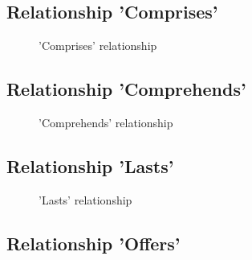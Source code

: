 \subsection*{Relationship 'Comprises'}

\begin{minipage}[h]{0.5\textwidth}
    \begin{figure}[H]
        
        \caption{'Comprises' relationship}
        \label{fig:orm_o_sp}
    \end{figure}
\end{minipage}
\hfill
\begin{minipage}[h]{0.45\textwidth}
    \blindtext
\end{minipage}

\subsection*{Relationship 'Comprehends'}

\begin{minipage}[h]{0.5\textwidth}
    \begin{figure}[H]
        
        \caption{'Comprehends' relationship}
        \label{fig:orm_o_sp}
    \end{figure}
\end{minipage}
\hfill
\begin{minipage}[h]{0.45\textwidth}
    \blindtext
\end{minipage}

\subsection*{Relationship 'Lasts'}

\begin{minipage}[h]{0.5\textwidth}
    \begin{figure}[H]
        
        \caption{'Lasts' relationship}
        \label{fig:orm_o_vp}
    \end{figure}
\end{minipage}
\hfill
\begin{minipage}[h]{0.45\textwidth}
    \blindtext
\end{minipage}

\subsection*{Relationship 'Offers'}

